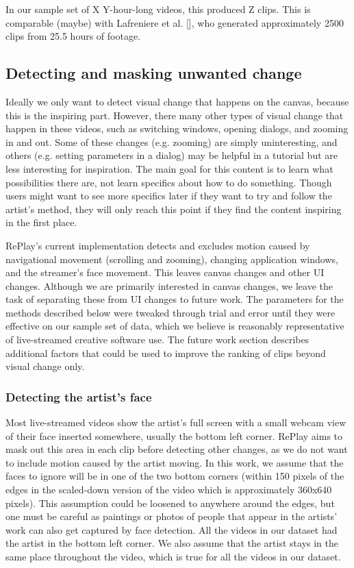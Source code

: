 In our sample set of X Y-hour-long videos, this produced Z clips. This is comparable (maybe) with Lafreniere et al. [], who generated approximately 2500 clips from 25.5 hours of footage.

\subsection{Detecting and masking unwanted change}
Ideally we only want to detect visual change that happens on the canvas, because this is the inspiring part. However, there many other types of visual change that happen in these videos, such as switching windows, opening dialogs, and zooming in and out. Some of these changes (e.g. zooming) are simply uninteresting, and others (e.g. setting parameters in a dialog) may be helpful in a tutorial but are less interesting for inspiration. The main goal for this content is to learn what possibilities there are, not learn specifics about how to do something. Though users might want to see more specifics later if they want to try and follow the artist's method, they will only reach this point if they find the content inspiring in the first place. 

RePlay's current implementation detects and excludes motion caused by navigational movement (scrolling and zooming), changing application windows, and the streamer's face movement. This leaves canvas changes and other UI changes. Although we are primarily interested in canvas changes, we leave the task of separating these from UI changes to future work. The parameters for the methods described below were tweaked through trial and error until they were effective on our sample set of data, which we believe is reasonably representative of live-streamed creative software use. The future work section describes additional factors that could be used to improve the ranking of clips beyond visual change only.

\subsubsection{Detecting the artist's face}
Most live-streamed videos show the artist's full screen with a small webcam view of their face inserted somewhere, usually the bottom left corner. RePlay aims to mask out this area in each clip before detecting other changes, as we do not want to include motion caused by the artist moving. In this work, we assume that the faces to ignore will be in one of the two bottom corners (within 150 pixels of the edges in the scaled-down version of the video which is approximately 360x640 pixels). This assumption could be loosened to anywhere around the edges, but one must be careful as paintings or photos of people that appear in the artists' work can also get captured by face detection. All the videos in our dataset had the artist in the bottom left corner. We also assume that the artist stays in the same place throughout the video, which is true for all the videos in our dataset.

